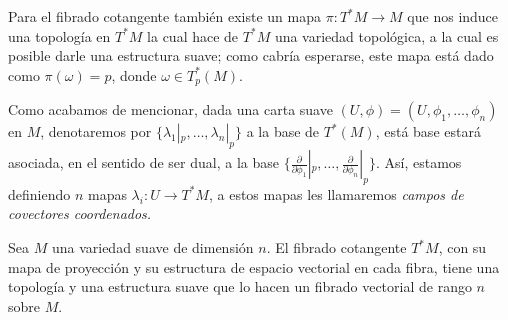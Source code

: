 Para el fibrado cotangente también existe un mapa $\pi: T^{*}M \to M$ que nos induce una topología en $T^{*}M$ la cual hace de $T^{*}M$ una variedad topológica, a la cual es posible darle una estructura suave; como cabría esperarse, este mapa está dado como $\pi(\omega) = p$, donde $\omega \in T_p^{*}(M)$.

Como acabamos de mencionar, dada una carta suave $(U,\phi) = (U,\phi_1,\ldots,\phi_n)$ en $M$, denotaremos por $\{\lambda_1|_p,\ldots,\lambda_n|_p\}$ a la base de $T^*(M)$, está base estará asociada, en el sentido de ser dual, a la base $\{\frac{\partial}{\partial \phi_1}|_p, \ldots, \frac{\partial}{\partial \phi_n}|_p\}$. Así, estamos definiendo $n$ mapas $\lambda_i: U \to T^{*}M$, a estos mapas les llamaremos \it{campos de covectores coordenados}.

\begin{theorem}
	Sea $M$ una variedad suave de dimensión $n$. El fibrado cotangente $T^{*}M$, con su mapa de proyección y su estructura de espacio vectorial en cada fibra, tiene una topología y una estructura suave que lo hacen un fibrado vectorial de rango $n$ sobre $M$.
\end{theorem}

